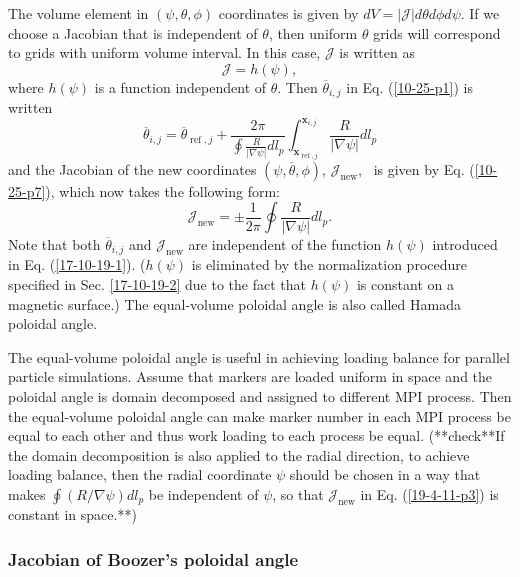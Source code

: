 \documentclass{llncs}
\newcommand{\tmop}[1]{\ensuremath{\operatorname{#1}}}
\begin{document}
The volume element in $(\psi, \theta, \phi)$ coordinates is given by $d V =
|\mathcal{J}| d \theta d \phi d \psi$. If we choose a Jacobian that is
independent of $\theta$, then uniform $\theta$ grids will correspond to grids
with uniform volume interval. In this case, $\mathcal{J}$ is written as
\begin{equation}
  \label{17-10-19-1} \mathcal{J}= h (\psi),
\end{equation}
where $h (\psi)$ is a function independent of $\theta$. Then
$\overline{\theta}_{i, j}$ in Eq. (\ref{10-25-p1}) is written
\begin{equation}
  \overline{\theta}_{i, j} = \overline{\theta}_{\tmop{ref}, j} + \frac{2
  \pi}{\oint \frac{R}{| \nabla \psi |} d l_p} \int_{\mathbf{x}_{\tmop{ref},
  j}}^{\mathbf{x}_{i, j}} \frac{R}{| \nabla \psi |} d l_p
\end{equation}
and the Jacobian of the new coordinates $(\psi, \overline{\theta}, \phi)$,
$\mathcal{J}_{\tmop{new}}$, \ is given by Eq. (\ref{10-25-p7}), which now
takes the following form:
\begin{equation}
  \label{19-4-11-p3} \mathcal{J}_{\tmop{new}} = \pm \frac{1}{2 \pi} \oint
  \frac{R}{| \nabla \psi |} d l_p .
\end{equation}
Note that both $\overline{\theta}_{i, j}$ and $\mathcal{J}_{\tmop{new}}$ are
independent of the function $h (\psi)$ introduced in Eq. (\ref{17-10-19-1}).
($h (\psi)$ is eliminated by the normalization procedure specified in Sec.
\ref{17-10-19-2} due to the fact that $h (\psi)$ is constant on a magnetic
surface.) The equal-volume poloidal angle is also called Hamada poloidal
angle.

The equal-volume poloidal angle is useful in achieving loading balance for
parallel particle simulations. Assume that markers are loaded uniform in space
and the poloidal angle is domain decomposed and assigned to different MPI
process. Then the equal-volume poloidal angle can make marker number in each
MPI process be equal to each other and thus work loading to each process be
equal. (**check**If the domain decomposition is also applied to the radial
direction, to achieve loading balance, then the radial coordinate $\psi$
should be chosen in a way that makes $\oint (R / \nabla \psi) d l_p$ be
independent of $\psi$, so that $\mathcal{J}_{\tmop{new}}$ in Eq.
(\ref{19-4-11-p3}) is constant in space.**)

\subsubsection{Jacobian of Boozer's poloidal angle}
\end{document}
